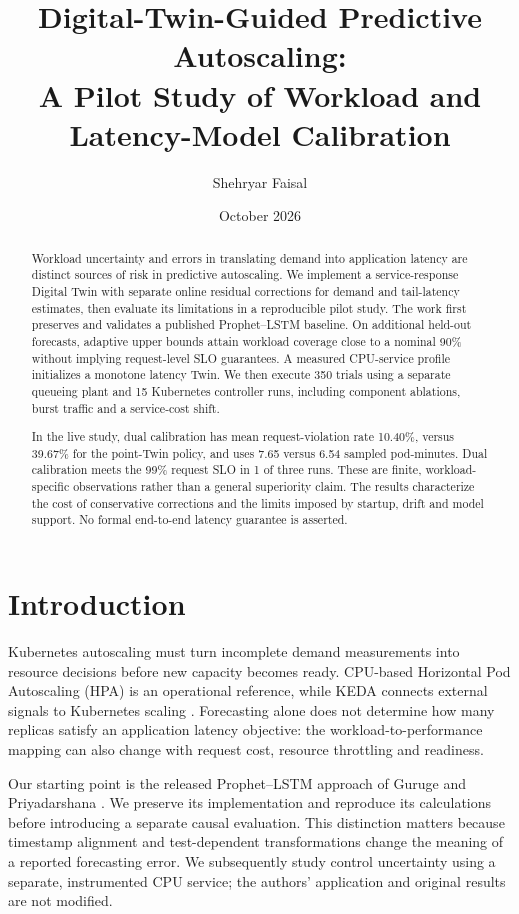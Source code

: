 \documentclass[11pt,a4paper]{article}
\title{Digital-Twin-Guided Predictive Autoscaling:\\A Pilot Study of Workload and Latency-Model Calibration}
\author{Shehryar Faisal}
\date{October 2026}
\begin{document}
\maketitle
\begin{abstract}
Workload uncertainty and errors in translating demand into application latency are distinct sources of risk in predictive autoscaling. We implement a service-response Digital Twin with separate online residual corrections for demand and tail-latency estimates, then evaluate its limitations in a reproducible pilot study. The work first preserves and validates a published Prophet--LSTM baseline. On additional held-out forecasts, adaptive upper bounds attain workload coverage close to a nominal 90\% without implying request-level SLO guarantees. A measured CPU-service profile initializes a monotone latency Twin. We then execute 350 trials using a separate queueing plant and 15 Kubernetes controller runs, including component ablations, burst traffic and a service-cost shift.

In the live study, dual calibration has mean request-violation rate 10.40\%, versus 39.67\% for the point-Twin policy, and uses 7.65 versus 6.54 sampled pod-minutes. Dual calibration meets the 99\% request SLO in 1 of three runs. These are finite, workload-specific observations rather than a general superiority claim. The results characterize the cost of conservative corrections and the limits imposed by startup, drift and model support. No formal end-to-end latency guarantee is asserted.\end{abstract}


\section{Introduction}
Kubernetes autoscaling must turn incomplete demand measurements into resource decisions before new capacity becomes ready. CPU-based Horizontal Pod Autoscaling (HPA) is an operational reference, while KEDA connects external signals to Kubernetes scaling \cite{k8s,keda}. Forecasting alone does not determine how many replicas satisfy an application latency objective: the workload-to-performance mapping can also change with request cost, resource throttling and readiness.

Our starting point is the released Prophet--LSTM approach of Guruge and Priyadarshana \cite{guruge}. We preserve its implementation and reproduce its calculations before introducing a separate causal evaluation. This distinction matters because timestamp alignment and test-dependent transformations change the meaning of a reported forecasting error. We subsequently study control uncertainty using a separate, instrumented CPU service; the authors' application and original results are not modified.
\end{document}
